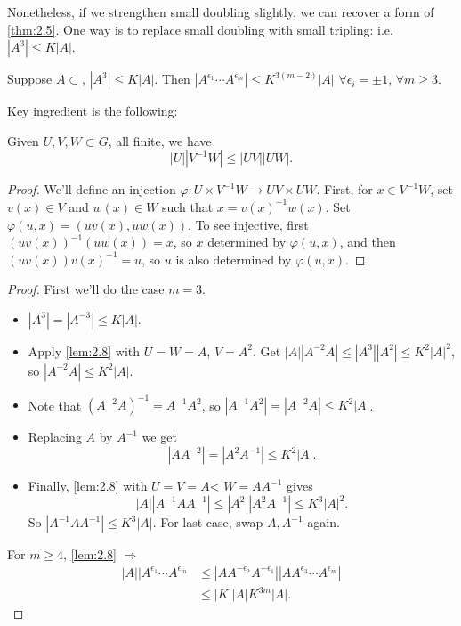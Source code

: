 \documentclass{article}
\numberwithin{equation}{section}
\begin{document}
Nonetheless, if we strengthen small doubling slightly, we can recover a form of \cref{thm:2.5}.
One way is to replace small doubling with small tripling: i.e.\ $|A^3| \leq K|A|$.
\begin{nprop}
  Suppose $A \subset $, $|A^3| \leq K|A|$. Then $|A^{\epsilon_1} \dotsm A^{\epsilon_m}| \leq K^{3(m-2)} |A|$ $\forall \epsilon_i = \pm 1$, $\forall m \geq 3$.
\end{nprop}
Key ingredient is the following:
\begin{nlemma}\label{lem:2.8}
  Given $U,V,W \subset G$, all finite, we have
  \begin{equation*}
    |U| |V^{-1} W| \leq |UV| |UW|.
  \end{equation*}
\end{nlemma}
\begin{proof}
  We'll define an injection $\varphi: U \times V^{-1} W \to UV \times UW$.
  First, for $x \in V^{-1}W$, set $v(x) \in V$ and $w(x) \in W$ such that $x = v(x)^{-1} w(x)$.
  Set $\varphi(u,x) = (uv(x), uw(x))$. To see injective, first $(uv(x))^{-1} (uw(x)) = x$, so $x$ determined by $\varphi(u,x)$, and then $(uv(x))v(x)^{-1} = u$, so $u$ is also determined by $\varphi(u,x)$.
\end{proof}
\begin{proof}
  First we'll do the case $m=3$.
  \begin{itemize}
    \item $|A^3| = |A^{-3}| \leq K|A|$.
    \item Apply \cref{lem:2.8} with $U=W=A$, $V = A^2$.
      Get $|A| |A^{-2} A| \leq |A^3| |A^2| \leq K^2 |A|^2$, so $|A^{-2} A| \leq K^2 |A|$.
    \item Note that $(A^{-2} A)^{-1} = A^{-1} A^2$, so $|A^{-1} A^2| = |A^{-2} A| \leq K^2 |A|$.
    \item Replacing $A$ by $A^{-1}$ we get
      \begin{equation*}
        |A A^{-2}| = |A^2 A^{-1}| \leq K^2 |A|.
      \end{equation*}
    \item Finally, \cref{lem:2.8} with $U=V=A$< $W = A A^{-1}$ gives
      \begin{equation*}
        |A| |A^{-1} A A^{-1}| \leq |A^2| |A^2 A^{-1}| \leq K^3 |A|^2.
      \end{equation*}
      So $|A^{-1} A A^{-1}| \leq K^3 |A|$. For last case, swap $A,A^{-1}$ again.
  \end{itemize}
  For $m \geq 4$, \cref{lem:2.8} $\Rightarrow$
  \begin{align*}
    |A| |A^{\epsilon_1} \dotsm A^{\epsilon_m} &\leq |A A^{-\epsilon_2} A^{-\epsilon_1}| |A A^{\epsilon_3} \dotsm  A^{\epsilon_m}| \\
                                              & \leq |K| |A| K^{3m} |A|.
  \end{align*}
\end{proof}
\printindex
\end{document}
